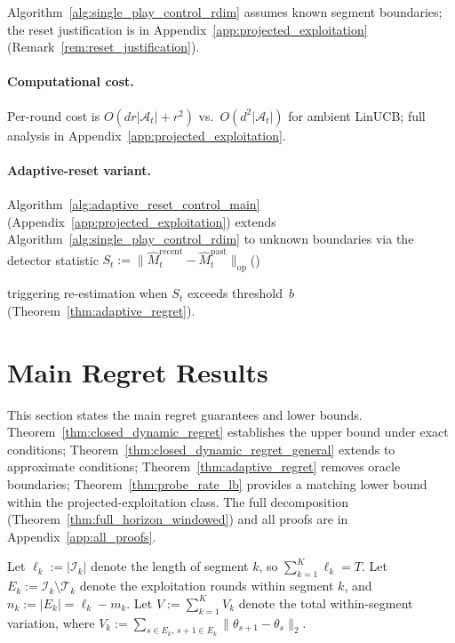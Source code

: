 \documentclass{article}
\newcommand{\op}{\mathrm{op}}
\newcommand{\cA}{\mathcal{A}}
\newcommand{\cT}{\mathcal{T}}
\newcommand{\cI}{\mathcal{I}}
\begin{document}
Algorithm~\ref{alg:single_play_control_rdim} assumes known segment boundaries; the reset justification is in Appendix~\ref{app:projected_exploitation} (Remark~\ref{rem:reset_justification}).

\paragraph{Computational cost.}
Per-round cost is $O(dr|\cA_t| + r^2)$ vs.\ $O(d^2|\cA_t|)$ for ambient LinUCB; full analysis in Appendix~\ref{app:projected_exploitation}.

\paragraph{Adaptive-reset variant.}
Algorithm~\ref{alg:adaptive_reset_control_main}
(Appendix~\ref{app:projected_exploitation}) extends
Algorithm~\ref{alg:single_play_control_rdim} to unknown boundaries via
the detector statistic
$S_t := \|\widehat{M}_t^{\mathrm{recent}} - \widehat{M}_t^{\mathrm{past}}\|_{\op}$\hfill{}(\theequation)\label{eq:detector_stat}

\noindent triggering re-estimation when $S_t$ exceeds threshold~$b$
(Theorem~\ref{thm:adaptive_regret}).
\section{Main Regret Results}
\label{sec:theory}

  This section states the main regret guarantees and lower bounds.
  Theorem~\ref{thm:closed_dynamic_regret} establishes the upper bound under exact conditions;
  Theorem~\ref{thm:closed_dynamic_regret_general} extends to approximate conditions;
  Theorem~\ref{thm:adaptive_regret} removes oracle boundaries;
  Theorem~\ref{thm:probe_rate_lb} provides a matching lower bound within the projected-exploitation class.
  The full decomposition
  (Theorem~\ref{thm:full_horizon_windowed}) and all proofs are in
  Appendix~\ref{app:all_proofs}.


  Let $\ell_k := |\cI_k|$ denote the length of segment $k$, so $\sum_{k=1}^K \ell_k = T$.
  Let $E_k := \cI_k \setminus \cT_k$ denote the exploitation rounds within segment $k$, and $n_k := |E_k| = \ell_k - m_k$.
  Let $V := \sum_{k=1}^K V_k$ denote the total within-segment variation, where $V_k := \sum_{s\in E_k,\,s+1\in
  E_k}\|\theta_{s+1}-\theta_s\|_2$.
\end{document}
